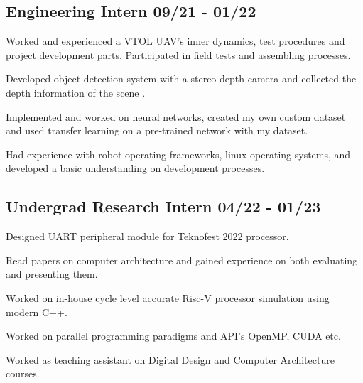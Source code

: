\documentclass[a4paper,12pt]{article}
\begin{document}


\vspace*{10pt}
\subsection{{Engineering Intern }\hfill 09/21 - 01/22}
\begin{zitemize}
\item Worked and experienced a VTOL UAV's inner dynamics, test procedures and project development parts. Participated in field tests and assembling processes.
\item Developed object detection system with a stereo depth camera and collected the depth information of the scene .
\item Implemented and worked on neural networks, created my own custom dataset and used transfer learning on a pre-trained network with my dataset.
\item Had experience with robot operating frameworks, linux operating systems, and developed a basic understanding on development processes.

\end{zitemize}

\vspace*{6pt}
\subsection{{Undergrad Research Intern }\hfill 04/22 - 01/23}
\begin{zitemize}
\item Designed UART peripheral module for Teknofest 2022 processor. 
\item Read papers on computer architecture and gained experience on both evaluating and presenting them.
\item Worked on in-house cycle level accurate Risc-V processor simulation using modern C++.
\item Worked on parallel programming paradigms and API's OpenMP, CUDA etc.
\item Worked as teaching assistant on Digital Design and Computer Architecture courses.

\end{zitemize}
\end{document}
